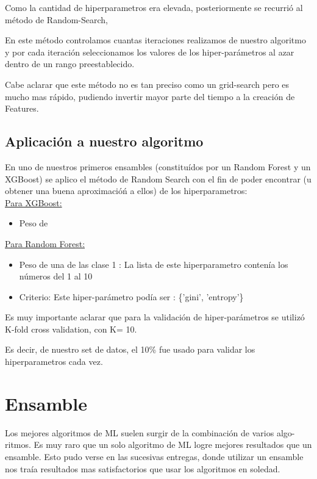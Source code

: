 \documentclass[a4paper ,12pt]{article}
\begin{document}
Como la cantidad de hiperparametros era elevada, posteriormente se recurrió al método de Random-Search,

En este método controlamos cuantas iteraciones realizamos de nuestro algoritmo y por cada iteración seleccionamos los valores de los
hiper-parámetros al azar dentro de un rango preestablecido. 

Cabe aclarar que este método no es tan preciso como un grid-search pero es mucho mas rápido, pudiendo invertir mayor parte del tiempo a la creación de Features.

\subsection{Aplicación a nuestro algoritmo}

En uno de nuestros primeros ensambles (constituídos por un Random Forest y un XGBoost) se aplico el método de Random Search con el fin de poder encontrar (u obtener una buena aproximacióń a ellos) de los hiperparametros:\\

\underline{Para XGBoost: }

\begin{itemize}
	\item Peso de
\end{itemize}



\underline{Para Random Forest:}

\begin{itemize}
	
	\item Peso de una de las clase 1 : La lista de este hiperparametro contenía los números del 1 al 10
	
	\item Criterio: Este hiper-parámetro podía ser : \{'gini', 'entropy'\}

\end{itemize}


Es muy importante aclarar que para la validación de hiper-parámetros se utilizó K-fold cross validation, con K= 10.

Es decir, de nuestro set de datos, el 10\% fue usado para validar los hiperparametros cada vez.


\newpage
\section{Ensamble}

Los mejores algoritmos de ML suelen surgir de la combinación de varios algo-
ritmos. Es muy raro que un solo algoritmo de ML logre mejores resultados que
un ensamble. Esto pudo verse en las sucesivas entregas, donde utilizar un ensamble nos traía
resultados mas satisfactorios que usar los algoritmos en soledad.
\end{document}
